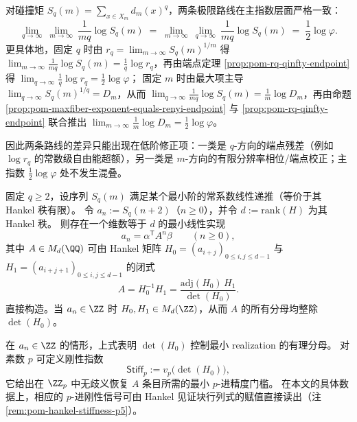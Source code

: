 \begin{corollary}\label{cor:pom-double-limit-commute-principal-exponent}
对碰撞矩 \(S_q(m)=\sum_{x\in X_m}d_m(x)^q\)，两条极限路线在主指数层面严格一致：
\[
\lim_{q\to\infty}\ \lim_{m\to\infty}\ \frac{1}{mq}\log S_q(m)
\;=\;
\lim_{m\to\infty}\ \lim_{q\to\infty}\ \frac{1}{mq}\log S_q(m)
\;=\;\frac12\log\varphi.
\]
更具体地，固定 \(q\) 时由 \(r_q=\lim_{m\to\infty}S_q(m)^{1/m}\) 得
\(
\lim_{m\to\infty}\frac{1}{mq}\log S_q(m)=\frac{1}{q}\log r_q
\)，再由端点定理 \ref{prop:pom-rq-qinfty-endpoint} 得 \(\lim_{q\to\infty}\frac{1}{q}\log r_q=\frac12\log\varphi\)；
固定 \(m\) 时由最大项主导 \(\lim_{q\to\infty}S_q(m)^{1/q}=D_m\)，从而
\(
\lim_{q\to\infty}\frac{1}{mq}\log S_q(m)=\frac{1}{m}\log D_m
\)，再由命题 \ref{prop:pom-maxfiber-exponent-equals-renyi-endpoint} 与 \ref{prop:pom-rq-qinfty-endpoint} 联合推出 \(\lim_{m\to\infty}\frac{1}{m}\log D_m=\frac12\log\varphi\)。
\par
因此两条路线的差异只能出现在低阶修正项：一类是 \(q\)-方向的端点残差（例如 \(\log r_q\) 的常数级自由能超额），另一类是 \(m\)-方向的有限分辨率相位/端点校正；主指数 \(\tfrac12\log\varphi\) 处不发生混叠。
\end{corollary}

\begin{proposition}\label{prop:pom-hankel-realization-protocol}
固定 \(q\ge 2\)，设序列 \(S_q(m)\) 满足某个最小阶的常系数线性递推（等价于其 Hankel 秩有限）。
令 \(a_n:=S_q(n+2)\)（\(n\ge 0\)），并令 \(d:=\mathrm{rank}(H)\) 为其 Hankel 秩。
则存在一个维数等于 \(d\) 的最小线性实现
\[
a_n=\alpha^{\mathsf T}A^n\beta\qquad(n\ge 0),
\]
其中 \(A\in M_d(\QQ)\) 可由 Hankel 矩阵 \(H_0=(a_{i+j})_{0\le i,j\le d-1}\) 与 \(H_1=(a_{i+j+1})_{0\le i,j\le d-1}\) 的闭式
\[
A=H_0^{-1}H_1=\frac{\mathrm{adj}(H_0)\,H_1}{\det(H_0)}.
\]
直接构造。当 \(a_n\in\ZZ\) 时 \(H_0,H_1\in M_d(\ZZ)\)，从而 \(A\) 的所有分母均整除 \(\det(H_0)\)。
\end{proposition}

\begin{remark}\label{rem:pom-hankel-denominator-stiffness}
在 \(a_n\in\ZZ\) 的情形，上式表明 \(\det(H_0)\) 控制最小 realization 的有理分母。
对素数 \(p\) 可定义刚性指数
\[
\mathsf{Stiff}_p:=v_p\!\bigl(\det(H_0)\bigr),
\]
它给出在 \(\ZZ_p\) 中无歧义恢复 \(A\) 条目所需的最小 \(p\)-进精度门槛。
在本文的具体数据上，相应的 \(p\)-进刚性信号可由 Hankel 见证块行列式的赋值直接读出（注 \ref{rem:pom-hankel-stiffness-p5}）。
\end{remark}

